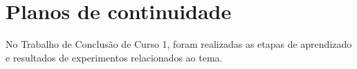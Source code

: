 \chapter{Planos de continuidade}
No Trabalho de Conclusão de Curso 1, foram realizadas as etapas de aprendizado e resultados de experimentos
relacionados ao tema.
